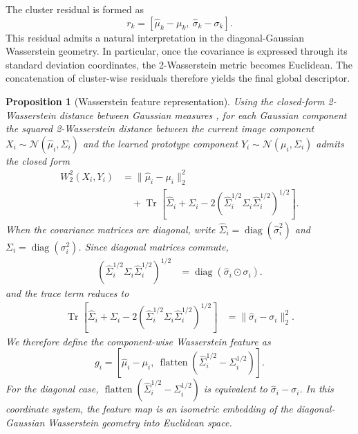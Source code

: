 \documentclass[journal]{IEEEtran}
\DeclareMathOperator{\flatten}{flatten}
\newtheorem{proposition}{Proposition}
\begin{document}
The cluster residual is formed as
\[
r_k = [\hat{\mu}_k - \mu_k,\ \hat{\sigma}_k - \sigma_k].
\]
This residual admits a natural interpretation in the diagonal-Gaussian Wasserstein geometry. In particular, once the covariance is expressed through its standard deviation coordinates, the 2-Wasserstein metric becomes Euclidean. The concatenation of cluster-wise residuals therefore yields the final global descriptor.

\begin{proposition}[Wasserstein feature representation]
Using the closed-form 2-Wasserstein distance between Gaussian measures \cite{wgan}, for each Gaussian component the squared 2-Wasserstein distance between the current image component \(X_i \sim \mathcal{N}(\hat{\mu}_i,\hat{\Sigma}_i)\) and the learned prototype component \(Y_i \sim \mathcal{N}(\mu_i,\Sigma_i)\) admits the closed form
\begin{align}
W_2^2(X_i,Y_i)
&= \|\hat{\mu}_i - \mu_i\|_2^2 \nonumber\\
&\quad + \operatorname{Tr}\!\left[\hat{\Sigma}_i + \Sigma_i - 2\left(\hat{\Sigma}_i^{1/2}\Sigma_i\hat{\Sigma}_i^{1/2}\right)^{1/2}\right].
\end{align}
When the covariance matrices are diagonal, write \(\hat{\Sigma}_i = \operatorname{diag}(\hat{\sigma}_i^2)\) and \(\Sigma_i = \operatorname{diag}(\sigma_i^2)\). Since diagonal matrices commute,
\begin{align}
\left(\hat{\Sigma}_i^{1/2}\Sigma_i\hat{\Sigma}_i^{1/2}\right)^{1/2}
&= \operatorname{diag}(\hat{\sigma}_i \odot \sigma_i).
\end{align}
and the trace term reduces to
\begin{align}
\operatorname{Tr}\!\left[\hat{\Sigma}_i + \Sigma_i - 2\left(\hat{\Sigma}_i^{1/2}\Sigma_i\hat{\Sigma}_i^{1/2}\right)^{1/2}\right]
&= \|\hat{\sigma}_i - \sigma_i\|_2^2.
\end{align}
We therefore define the component-wise Wasserstein feature as
\[
g_i = [\hat{\mu}_i - \mu_i,\ \flatten(\hat{\Sigma}_i^{1/2} - \Sigma_i^{1/2})].
\]
For the diagonal case, \(\flatten(\hat{\Sigma}_i^{1/2} - \Sigma_i^{1/2})\) is equivalent to \(\hat{\sigma}_i - \sigma_i\). In this coordinate system, the feature map is an isometric embedding of the diagonal-Gaussian Wasserstein geometry into Euclidean space.

\end{proposition}
\end{document}
